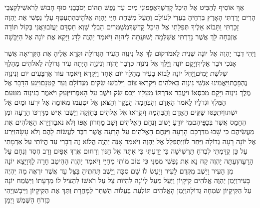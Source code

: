 \documentclass[../main/main.tex]{subfiles}
\begin{document}
\begin{multicols*}{\ncols}
אֵךְ\SubEnd{} אוֹסִיף לְהַבִּיט אֶל הֵיכַל קָדְשֶׁךָ\PreVerseSpace{}אֲפָפוּנִי מַיִם עַד נֶפֶשׁ תְּהוֹם יְסֹבְבֵנִי סוּף חָבוּשׁ לְרֹאשִׁי\PreVerseSpace{}לְקִצְבֵי הָרִים יָרַדְתִּי הָאָרֶץ בְּרִחֶיהָ בַעֲדִי לְעוֹלָם וַתַּעַל מִשַּׁחַת חַיַּי יַהְוֶה אֱלֹהָי\PreVerseSpace{}בְּהִתְעַטֵּף עָלַי נַפְשִׁי אֶת יַהְוֶה זָכָרְתִּי וַתָּבוֹא אֵלֶיךָ תְּפִלָּתִי אֶל הֵיכַל קָדְשֶׁךָ\PreVerseSpace{}מְשַׁמְּרִים הַבְלֵי שָׁוְא חַסְדָּם יַעֲזֹבוּ\PreVerseSpace{}וַאֲנִי בְּקוֹל תּוֹדָה אֶזְבְּחָה לָּךְ אֲשֶׁר נָדַרְתִּי אֲשַׁלֵּמָה יְשׁוּעָתָה לַיהוָה \ClosedSection{}וַיֹּאמֶר יַהְוֶה לַדָּג וַיָּקֵא אֶת יוֹנָה אֶל הַיַּבָּשָׁה\OpenSection{}\par
{}וַיְהִי דְבַר יַהְוֶה אֶל יוֹנָה שֵׁנִית לֵאמֹר\PreVerseSpace{}קוּם לֵךְ אֶל נִינְוֵה הָעִיר הַגְּדוֹלָה וּקְרָא אֵלֶיהָ אֶת הַקְּרִיאָה אֲשֶׁר אָנֹכִי דֹּבֵר אֵלֶיךָ\PreVerseSpace{}וַיָּקָם יוֹנָה וַיֵּלֶךְ אֶל נִינְוֶה כִּדְבַר יַהְוֶה וְנִינְוֵה הָיְתָה עִיר גְּדוֹלָה לֵאלֹהִים מַהֲלַךְ שְׁלֹשֶׁת יָמִים\PreVerseSpace{}וַיָּחֶל יוֹנָה לָבוֹא בָעִיר מַהֲלַךְ יוֹם אֶחָד וַיִּקְרָא וַיֹּאמַר עוֹד אַרְבָּעִים יוֹם וְנִינְוֵה נֶהְפָּכֶת\PreVerseSpace{}וַיַּאֲמִינוּ אַנְשֵׁי נִינְוֵה בֵּאלֹהִים וַיִּקְרְאוּ צוֹם וַיִּלְבְּשׁוּ שַׂקִּים מִגְּדוֹלָם וְעַד קְטַנָּם\PreVerseSpace{}וַיִּגַּע הַדָּבָר אֶל מֶלֶךְ נִינְוֵה וַיָּקָם מִכִּסְאוֹ וַיַּעֲבֵר אַדַּרְתּוֹ מֵעָלָיו וַיְכַס שַׂק וַיֵּשֶׁב עַל הָאֵפֶר\PreVerseSpace{}וַיַּזְעֵק וַיֹּאמֶר בְּנִינְוֵה מִטַּעַם הַמֶּלֶךְ וּגְדֹלָיו לֵאמֹר הָאָדָם וְהַבְּהֵמָה הַבָּקָר וְהַצֹּאן אַל יִטְעֲמוּ מְאוּמָה אַל יִרְעוּ וּמַיִם אַל יִשְׁתּוּ\PreVerseSpace{}וְיִתְכַּסּוּ שַׂקִּים הָאָדָם וְהַבְּהֵמָה וְיִקְרְאוּ אֶל אֱלֹהִים בְּחָזְקָה וְיָשֻׁבוּ אִישׁ מִדַּרְכּוֹ הָרָעָה וּמִן הֶחָמָס אֲשֶׁר בְּכַפֵּיהֶם\PreVerseSpace{}מִי יוֹדֵעַ יָשׁוּב וְנִחַם הָאֱלֹהִים וְשָׁב מֵחֲרוֹן אַפּוֹ וְלֹא נֹאבֵד\PreVerseSpace{}וַיַּרְא הָאֱלֹהִים אֶת מַעֲשֵׂיהֶם כִּי שָׁבוּ מִדַּרְכָּם הָרָעָה וַיִּנָּחֶם הָאֱלֹהִים עַל הָרָעָה אֲשֶׁר דִּבֶּר לַעֲשׂוֹת לָהֶם וְלֹא עָשָׂה\PreChapterSpace{}וַיֵּרַע אֶל יוֹנָה רָעָה גְדוֹלָה וַיִּחַר לוֹ\PreVerseSpace{}וַיִּתְפַּלֵּל אֶל יַהְוֶה וַיֹּאמַר אָנָּה יַהְוֶה הֲלוֹא זֶה דְבָרִי עַד הֱיוֹתִי עַל אַדְמָתִי עַל כֵּן קִדַּמְתִּי לִבְרֹחַ תַּרְשִׁישָׁה כִּי יָדַעְתִּי כִּי אַתָּה אֵל חַנּוּן וְרַחוּם אֶרֶךְ אַפַּיִם וְרַב חֶסֶד וְנִחָם עַל הָרָעָה\PreVerseSpace{}וְעַתָּה יַהְוֶה קַח נָא אֶת נַפְשִׁי מִמֶּנִּי כִּי טוֹב מוֹתִי מֵחַיָּי \ClosedSection{}וַיֹּאמֶר יַהְוֶה הַהֵיטֵב חָרָה לָךְ\PreVerseSpace{}וַיֵּצֵא יוֹנָה מִן הָעִיר וַיֵּשֶׁב מִקֶּדֶם לָעִיר וַיַּעַשׂ לוֹ שָׁם סֻכָּה וַיֵּשֶׁב תַּחְתֶּיהָ בַּצֵּל עַד אֲשֶׁר יִרְאֶה מַה יִּהְיֶה בָּעִיר\PreVerseSpace{}וַיְמַן יַהְוֶה אֱלֹהִים קִיקָיוֹן וַיַּעַל מֵעַל לְיוֹנָה לִהְיוֹת צֵל עַל רֹאשׁוֹ לְהַצִּיל לוֹ מֵרָעָתוֹ וַיִּשְׂמַח יוֹנָה עַל הַקִּיקָיוֹן שִׂמְחָה גְדוֹלָה\PreVerseSpace{}וַיְמַן הָאֱלֹהִים תּוֹלַעַת בַּעֲלוֹת הַשַּׁחַר לַמָּחֳרָת וַתַּךְ אֶת הַקִּיקָיוֹן וַיִּיבָשׁ\PreVerseSpace{}וַיְהִי כִּזְרֹחַ הַשֶּׁמֶשׁ וַיְמַן 
\end{multicols*}
\end{document}
